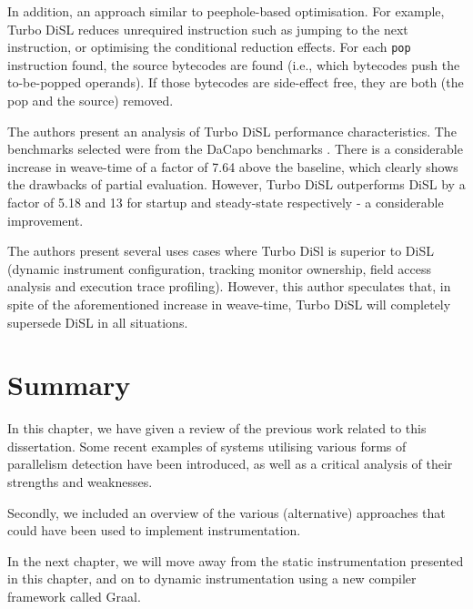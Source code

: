                 In addition, an approach similar to peephole-based optimisation. For example, Turbo DiSL reduces unrequired instruction such as jumping to the next instruction, or optimising the conditional reduction effects. For each \texttt{pop} instruction found, the source bytecodes are found (i.e., which bytecodes push the to-be-popped operands). If those bytecodes are side-effect free, they are both (the pop and the source) removed.

                The authors present an analysis of Turbo DiSL performance characteristics. The benchmarks selected were from the DaCapo benchmarks \citep{Blackburn2006}. There is a considerable increase in weave-time of a factor of 7.64 above the baseline, which clearly shows the drawbacks of partial evaluation. However, Turbo DiSL outperforms DiSL by a factor of 5.18 and 13 for startup and steady-state respectively - a considerable improvement.

                The authors present several uses cases where Turbo DiSl is superior to DiSL (dynamic instrument configuration, tracking monitor ownership, field access analysis and execution trace profiling). However, this author speculates that, in spite of the aforementioned increase in weave-time, Turbo DiSL will completely supersede DiSL in all situations.
           
 \section{Summary} \label{sec:related/summary}
 In this chapter, we have given a review of the previous work related to this dissertation. Some recent examples of systems utilising various forms of parallelism detection have been introduced, as well as a critical analysis of their strengths and weaknesses.
 
 Secondly, we included an overview of the various (alternative) approaches that could have been used to implement instrumentation.
 
 In the next chapter, we will move away from the static instrumentation presented in this chapter, and on to dynamic instrumentation using a new compiler framework called Graal.